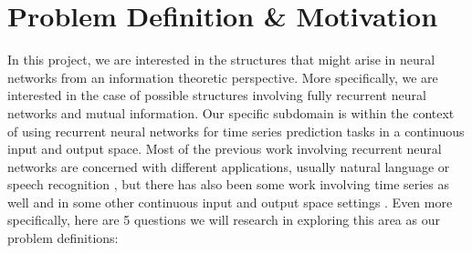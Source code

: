 \begin{titlepage}



 

\vfill %

\end{titlepage}



\section{Problem Definition \& Motivation}

In this project, we are interested in the structures that might arise in neural
networks from an information theoretic perspective. More specifically, we are
interested in the case of possible structures involving fully recurrent neural
networks and mutual information. Our specific subdomain is within the context of
using recurrent neural networks for time series prediction tasks in a continuous
input and output space. Most of the previous work involving recurrent neural
networks are concerned with different applications, usually natural language \cite{text} or
speech recognition \cite{speech}, but there has also been some work involving time series as
well \cite{rnn_time_series, rnn_stocks} and in some other continuous input and
output space settings \cite{text}. Even more specifically, here are 5 questions
we will research in exploring this area as our problem definitions:

